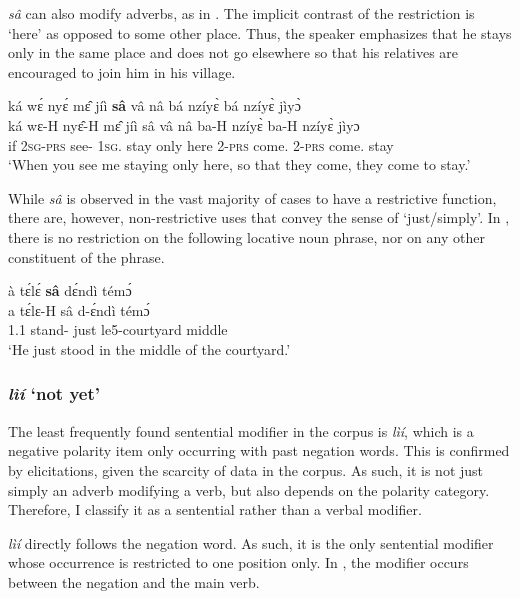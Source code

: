 {\itshape sâ} can also modify adverbs, as in .  The implicit contrast of the restriction is `here' as opposed to some other place. Thus, the speaker emphasizes that he stays only in the same place and does not go elsewhere so that his relatives are encouraged to join him in his village.

\ea \label{sa3}
  \glll  ká wɛ́ nyɛ́ mɛ̂ jíì {\bfseries sâ} vâ nâ bá nzíyɛ̀ bá nzíyɛ̀ jìyɔ̀ \\
       ká wɛ-H nyɛ̂-H mɛ̂ jíì sâ vâ nâ ba-H nzíyɛ̀ ba-H nzíyɛ̀ jìyɔ \\
         if 2\textsc{sg}-\textsc{prs} see-{\R} 1\textsc{sg}.{\OBJ} stay only here {\COMP} 2-\textsc{prs} come.{\SBJV} 2-\textsc{prs} come.{\SBJV} stay\\
    \trans `When you see me staying only here, so that they come, they come to stay.'
\z


While {\itshape sâ} is observed in the vast majority of cases to have a restrictive function, there are, however, non-restrictive uses that convey the sense of `just/simply'. In , there is no restriction on the following locative noun phrase, nor on any other constituent of the phrase.

\ea \label{sa4}
  \glll à tɛ́lɛ́ {\bfseries sâ} dɛ́ndì témɔ́ \\
         a tɛ́lɛ-H sâ d-ɛ́ndì témɔ́ \\
        1.{\PST}1 stand-{\R} just le5-courtyard middle\\
    \trans `He just stood in the middle of the courtyard.'
\z










\subsubsection*{{\itshape lìí} `not yet'}

The least frequently found sentential modifier in the corpus is {\itshape lìí}, which is a negative polarity item only occurring with past negation words. This is confirmed by elicitations, given the scarcity of data in the corpus. As such, it is not just simply an adverb modifying a verb, but also depends on the polarity category. Therefore, I classify it as a sentential rather than a verbal modifier.

{\itshape lìí} directly follows the negation word. As such, it is the only sentential modifier whose occurrence is restricted to one position only. In , the modifier occurs between the negation and the main verb.

